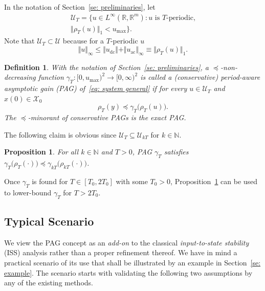 \documentclass[letterpaper, 10 pt, conference]{ieeeconf}
\newcommand{\mmax}{_\mathrm{max}}
\newcommand{\ac}{_\mathrm{ac}}
\newcommand{\dc}{_\mathrm{dc}}
\newcommand{\Linf}{L^\infty}
\newcommand{\pb}[1]{\big( #1 \big)}
\newcommand{\set}[1]{\lbrace #1 \rbrace}
\newcommand{\norm}[1]{\Vert #1 \Vert}
\newcommand{\bbR}{\mathbb{R}}
\newcommand{\bbN}{\mathbb{N}}
\newcommand{\calU}{\mathcal{U}}
\newcommand{\calX}{\mathcal{X}}
\newtheorem{definition}{Definition}
\newtheorem{proposition}{Proposition}
\begin{document}
In the notation of Section~\ref{se: preliminaries}, let
\begin{multline}
    \calU_T = \set{u \in \Linf(\bbR, \bbR^m) \colon u \text{\ is\ $T$-periodic,} \\
    \norm{\rho_T(u)}_1 < u\mmax}.
\end{multline}
Note that $\calU_T \subset \calU$ because for a $T$-periodic $u$
\begin{equation}
    \label{eq: 1-norm inf-norm inequality u}
    \norm{u}_\infty \leq \norm{u\dc} + \norm{u\ac}_\infty \equiv \norm{\rho_T(u)}_1.
\end{equation}

\begin{definition}
    \label{def: pag}
    With the notation of Section~\ref{se: preliminaries}, a $\preceq$-non-decreasing function $\gamma_T\colon [0, u\mmax)^2 \to [0, \infty)^2$ is called a (conservative) \emph{period-aware asymptotic gain} (PAG) of~\eqref{eq: system general} if for every $u \in \calU_T$ and $x(0) \in \calX_0$
    \begin{equation}
        \rho_T(y) \preceq \gamma_T\pb{\rho_T(u)}.
    \end{equation}
    The $\preceq$-minorant of conservative PAGs is the \emph{exact} PAG.
\end{definition}

The following claim is obvious since $\calU_T \subseteq \calU_{kT}$ for $k \in \bbN$.

\begin{proposition}
    \label{pr: integer periods}
    For all $k \in \bbN$ and $T > 0$, PAG $\gamma_T$ satisfies $\gamma_T\pb{\rho_T(\cdot)} \preceq \gamma_{kT}\pb{\rho_{kT}(\cdot)}$.
\end{proposition}

Once $\gamma_T$ is found for $T \in [T_0, 2T_0]$ with some $T_0 > 0$, Proposition~\ref{pr: integer periods} can be used to lower-bound $\gamma_T$ for $T > 2T_0$.

\subsection{Typical Scenario}
\label{se: scenario}

We view the PAG concept as an \emph{add-on} to the classical \emph{input-to-state stability} (ISS) analysis rather than a proper refinement thereof. We have in mind a practical scenario of its use that shall be illustrated by an example in Section~\ref{se: example}. The scenario starts with validating the following two assumptions by any of the existing methods.
\end{document}
